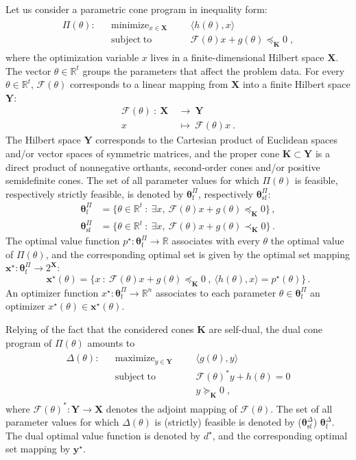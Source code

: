 \documentclass{article}
\DeclareMathOperator*{\minimize}{minimize}
\DeclareMathOperator*{\maximize}{maximize}
\DeclareMathOperator*{\subj}{subject\;to}
\newcommand{\R}{\mathbb{R}}         %
\newcommand{\opt}{\star}                    %
\newcommand{\adj}{\ast}                     %
\newcommand{\feas}{\mathrm{f}}              %
\newcommand{\strfeas}{\mathrm{sf}}          %
\newcommand{\ppar}{\theta}                          %
\newcommand{\Ppar}{{\bm{\theta}}}                   %
\newcommand{\X}{\mathbf{X}}                         %
\newcommand{\Y}{\mathbf{Y}}                         %
\newcommand{\K}{\mathbf{K}}                         %
\newcommand{\calF}{\mathcal{F}}                     %
\newcommand{\Pfeas}{\Ppar^\Pi_\feas}                %
\newcommand{\Pstrfeas}{\Ppar^\Pi_\strfeas}          %
\newcommand{\Dfeas}{\Ppar^\Delta_\feas}             %
\newcommand{\Dstrfeas}{\Ppar^\Delta_\strfeas}       %
\begin{document}
Let us consider a parametric cone program in inequality form:
\begin{gather}\label{eq:parametric_primal}
\begin{aligned}
\Pi(\ppar): && \minimize_{x\in\X} &&& \langle h(\ppar), x \rangle\\
            && \subj              &&& \calF(\ppar)x +g(\ppar)\preceq_\K 0 \;,%
\end{aligned}
\end{gather}
where the optimization variable $x$ lives in a finite-dimensional Hilbert space $\X$. The vector $\ppar\in\R^t$ groups the parameters that affect the problem data. For every $\ppar\in\R^t$, $\calF(\ppar)$ corresponds to a linear mapping from $\X$ into a finite Hilbert space $\Y$:
\begin{align*}
\calF(\ppar) ~:~ \X~ &\rightarrow~ \Y \\
                  x~ &\mapsto~ \calF(\ppar)x ~.
\end{align*}
The Hilbert space $\Y$ corresponds to the Cartesian product of Euclidean spaces and/or vector spaces of symmetric matrices, and the proper cone $\K\subset\Y$ is a direct product of nonnegative orthants, second-order cones and/or positive semidefinite cones. The set of all parameter values for which $\Pi(\ppar)$ is feasible, respectively strictly feasible, is denoted by $\Pfeas$, respectively $\Pstrfeas$:
\begin{align*}
\Pfeas    &= \{\ppar\in\R^t ~:~ \exists x ,~ \calF(\ppar)x+g(\ppar)\preceq_\K 0 \}\,,\\%
\Pstrfeas &= \{\ppar\in\R^t ~:~ \exists x ,~ \calF(\ppar)x+g(\ppar)\prec_\K 0 \}\,.%
\end{align*}
The optimal value function $p^\opt:\Pfeas\rightarrow\R$ associates with every $\ppar$ the optimal value of $\Pi(\ppar)$, and the corresponding optimal set is given by the optimal set mapping $\bm{x}^\opt:\Pfeas\rightarrow 2^{\X}$:
\[ \bm{x}^\opt(\ppar) = \{x ~:~ \calF(\ppar)x+g(\ppar)\preceq_\K 0 ~,~ \langle h(\ppar), x \rangle = p^\opt(\ppar)\} \,.%
\]
An optimizer function $x^\opt:\Pfeas\rightarrow\R^n$ associates to each parameter $\ppar\in\Pfeas$ an optimizer $x^\opt(\ppar)\in \bm{x}^\opt(\ppar)$.

Relying of the fact that the considered cones $\K$ are self-dual, the dual cone program of $\Pi(\ppar)$ amounts to
\begin{gather}\label{eq:parametric_dual}
\begin{aligned}
\Delta(\ppar): && \maximize_{y\in\Y} &&& \langle g(\ppar) , y \rangle\\
               && \subj              &&& \calF(\ppar)^* y + h(\ppar)= 0\\
               &&                    &&& y \succeq_\K 0  \;,
\end{aligned}
\end{gather}
where $\calF(\ppar)^\adj: \Y\rightarrow\X$ denotes the adjoint mapping of $\calF(\ppar)$. The set of all parameter values for which $\Delta(\ppar)$ is (strictly) feasible is denoted by ($\Dstrfeas$) $\Dfeas$. The dual optimal value function is denoted by $d^\opt$, and the corresponding optimal set mapping by $\bm{y}^\opt$.
\end{document}
